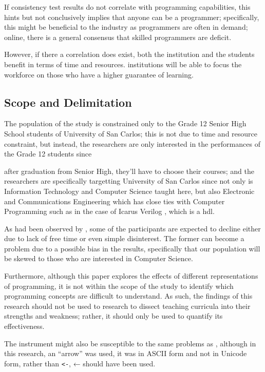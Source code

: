 \documentclass[12pt]{article}
\begin{document}
If consistency test results do not correlate with programming capabilities,
this hints but not conclusively implies that anyone can be a programmer; specifically, 
this might be beneficial to the industry as programmers are often in demand;
online, there is a general consensus that skilled programmers are deficit.

However, if there a correlation does exist, 
both the \gls{institution} and the students benefit in terms of time and resources.
\Glspl{institution} will be able to focus the workforce on those who have a higher guarantee of learning.

\subsection{Scope and Delimitation}
\label{sec:org3bcc2f4}
The population of the study is constrained only to the Grade 12 Senior High School students of University of San Carlos; 
this is not due to time and resource constraint, but instead, 
the researchers are only interested in the performances of the Grade 12 students since

after graduation from Senior High, they'll have to choose their courses; and
the researchers are specifically targetting University of San Carlos since 
not only is Information Technology and Computer Science taught here,
but also Electronic and Communications Engineering 
which has close ties with Computer Programming
such as in the case of Icarus Verilog \citep{iverilog}, 
which is a \gls{hdl}.

As had been observed by \citep{dehnadi2006camel}, 
some of the participants are expected to
decline either due to lack of free time or even simple disinterest.
The former can become a problem due to a possible bias in the results,
specifically that our population will be skewed to those who are
interested in Computer Science.

Furthermore, although this paper explores the effects of different representations of programming, 
it is not within the scope of the study to identify which programming concepts are difficult to understand. 
As such, the findings of this research should not be used to research to 
dissect teaching curricula into their strengths and weakness; rather, 
it should only be used to quantify its effectiveness.

The instrument might also be susceptible to the same problems as \cite{dehnadi2006camel},
although in this research, an ``arrow'' was used, 
it was in ASCII form and not in Unicode form,
rather than \texttt{<-}, ← should have been used.
\end{document}
